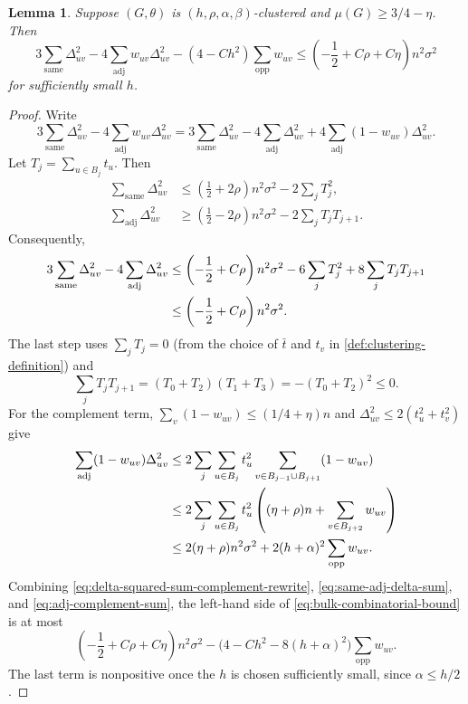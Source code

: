 \documentclass[reqno,11pt]{amsart}
\newtheorem{lemma}{Lemma}
\theoremstyle{definition}
\newcommand{\paren}[1]{\left(#1\right)}
\begin{document}
\begin{lemma}\label{lem:q-b-b-bound-step-2}
Suppose $(G,\theta)$ is $(h,\rho,\alpha,\beta)$-clustered and
$\mu(G)\ge3/4-\eta$.  Then
\begin{equation}\label{eq:bulk-combinatorial-bound}
3\sum_{\mathrm{same}}\Delta_{uv}^2
-4\sum_{\mathrm{adj}}w_{uv}\Delta_{uv}^2
-\paren{4-Ch^2}\sum_{\mathrm{opp}}w_{uv}
\le\paren{-\frac12+C\rho+C\eta}n^2\sigma^2
\end{equation} for sufficiently small $h$.
\end{lemma}

\begin{proof}
Write
\begin{equation}\label{eq:delta-squared-sum-complement-rewrite}
3\sum_{\mathrm{same}}\Delta_{uv}^2
-4\sum_{\mathrm{adj}}w_{uv}\Delta_{uv}^2
=3\sum_{\mathrm{same}}\Delta_{uv}^2
-4\sum_{\mathrm{adj}}\Delta_{uv}^2
+4\sum_{\mathrm{adj}}(1-w_{uv})\Delta_{uv}^2.
\end{equation}
Let $T_j=\sum_{u\in B_j}t_u$.  Then
\begin{align*}
\sum_{\mathrm{same}}\Delta_{uv}^2
&\le\paren{\frac12+2\rho}n^2\sigma^2
  -2\sum_jT_j^2,\\
\sum_{\mathrm{adj}}\Delta_{uv}^2
&\ge\paren{\frac12-2\rho}n^2\sigma^2
  -2\sum_jT_jT_{j+1}.
\end{align*}
Consequently,
\begin{align}
3\sum_{\mathrm{same}}\Delta_{uv}^2
-4\sum_{\mathrm{adj}}\Delta_{uv}^2
&\le\paren{-\frac12+C\rho}n^2\sigma^2
 -6\sum_jT_j^2+8\sum_jT_jT_{j+1}\notag\\
&\le\paren{-\frac12+C\rho}n^2\sigma^2.
\label{eq:same-adj-delta-sum}
\end{align}
The last step uses $\sum_jT_j=0$ (from the choice of $\bar t$ and $t_v$ in \cref{def:clustering-definition}) and
\[
    \sum_jT_jT_{j+1}
    =(T_0+T_2)(T_1+T_3)=-(T_0+T_2)^2\le0.
\]
For the complement term, $\sum_v(1-w_{uv})\le(1/4+\eta)n$ and
$\Delta_{uv}^2\le2(t_u^2+t_v^2)$ give
\begin{align}
\sum_{\mathrm{adj}}(1-w_{uv})\Delta_{uv}^2
&\le2\sum_j\sum_{u\in B_j}t_u^2
 \sum_{v\in B_{j-1}\cup B_{j+1}}(1-w_{uv})\notag\\
&\le2\sum_j\sum_{u\in B_j}t_u^2
 \left((\eta+\rho)n+\sum_{v\in B_{j+2}}w_{uv}\right)\notag\\
&\le2(\eta+\rho)n^2\sigma^2
  +2(h+\alpha)^2\sum_{\mathrm{opp}}w_{uv}.
\label{eq:adj-complement-sum}
\end{align}
Combining \eqref{eq:delta-squared-sum-complement-rewrite},
\eqref{eq:same-adj-delta-sum}, and \eqref{eq:adj-complement-sum}, the
left-hand side of \eqref{eq:bulk-combinatorial-bound} is at most
\[
\paren{-\frac12+C\rho+C\eta}n^2\sigma^2
-\bigl(4-Ch^2-8(h+\alpha)^2\bigr)
 \sum_{\mathrm{opp}}w_{uv}.
\]
The last term is nonpositive once the $h$ is chosen sufficiently small, since $\alpha\le h/2$.
\end{proof}
\end{document}
